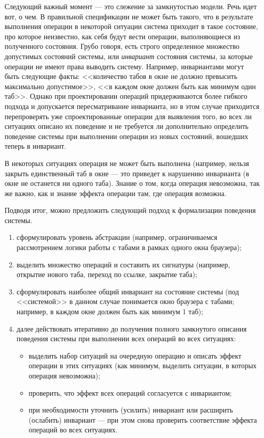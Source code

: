 \documentclass[14pt, twoside]{extreport}
\begin{document}
Следующий важный момент --- это слежение за замкнутостью модели. Речь идет вот, о чем. В правильной спецификации не может быть такого, что в результате выполнения операции в некоторой ситуации система приходит в такое состояние, про которое неизвестно, как себя будут вести операции, выполняющиеся из полученного состояния. Грубо говоря, есть строго определенное множество допустимых состояний системы, или \emph{инвариант} состояния системы, за которые операции не имеют права выводить систему. Например, инвариантами могут быть следующие факты: <<количество табов в окне не должно превысить максимально допустимое>>, <<в каждом окне должен быть как минимум один таб>>. Однако при проектировании операций придерживаются более гибкого подхода и допускается пересматривание инварианта, но в этом случае приходится перепроверять уже спроектированные операции для выявления того, во всех ли ситуациях описано их поведение и не требуется ли дополнительно определить поведение системы при выполнении операции из новых состояний, вошедших теперь в инвариант.

В некоторых ситуациях операция не может быть выполнена (например, нельзя закрыть единственный таб в окне --- это приведет к нарушению инварианта (в окне не останется ни одного таба). Знание о том, когда операция невозможна, так же важно, как и знание эффекта операции там, где операция возможна.

Подводя итог, можно предложить следующий подход к формализации поведения системы.

\begin{enumerate}
    \item сформулировать уровень абстракции (например, ограничиваемся рассмотрением логики работы с табами в рамках одного окна браузера);
    \item выделить множество операций и составить их сигнатуры (например, открытие нового таба, переход по ссылке, закрытие таба);
    \item сформулировать наиболее общий инвариант на состояние системы (под <<системой>> в данном случае понимается окно браузера с табами; например, в каждом окне должен быть как минимум 1 таб);
    \item далее действовать итеративно до получения полного замкнутого описания поведения системы при выполнении всех операций во всех ситуациях:
        \begin{itemize}
          \item выделить набор ситуаций на очередную операцию и описать эффект операции в этих ситуациях (как минимум, выделить ситуации, в которых операция невозможна);
          \item проверить, что эффект всех операций согласуется с инвариантом;
          \item при необходимости уточнить (усилить) инвариант или расширить (ослабить) инвариант --- при этом снова проверить соответствие эффекта операций во всех ситуациях.

        \end{itemize}
\end{enumerate}
\end{document}
